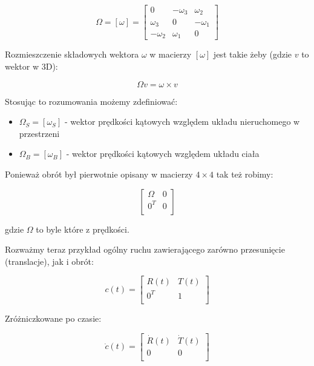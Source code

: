 \documentclass{article}
\begin{document}
$$
    \Omega=\left[\omega\right]=
    \begin{bmatrix}
        0           & -\omega_{3} & \omega_{2}  \\[0.3em]
        \omega_{3}  & 0           & -\omega_{1} \\[0.3em]
        -\omega_{2} & \omega_{1}  & 0
    \end{bmatrix}
$$

Rozmieszczenie składowych wektora $\omega$ w macierzy $\left[\omega\right]$ jest takie żeby (gdzie $v$ to wektor w 3D):

$$
    \Omega v = \omega \times v
$$

\newpage

Stosując to rozumowania możemy zdefiniować:

\begin{itemize}
    \item $\Omega_{S} = \left[\omega_{S}\right]$ - wektor prędkości kątowych względem układu nieruchomego w przestrzeni
    \item $\Omega_{B} = \left[\omega_{B}\right]$ - wektor prędkości kątowych względem układu ciała
\end{itemize}

Ponieważ obrót był pierwotnie opisany w macierzy $4\times4$ tak też robimy:

$$
    \begin{bmatrix}
        \Omega & 0 \\[0.3em]
        0^{T}  & 0 \\[0.3em]
    \end{bmatrix}
$$

gdzie $\Omega$ to byle które z prędkości.



Rozważmy teraz przykład ogólny ruchu zawierającego zarówno przesunięcie (translacje), jak i obrót:

$$
    c(t)=
    \begin{bmatrix}
        R(t)  & T(t) \\[0.3em]
        0^{T} & 1    \\[0.3em]
    \end{bmatrix}
$$

Zróżniczkowane po czasie:


$$
    \dot c(t)=
    \begin{bmatrix}
        \dot R(t) & \dot T(t) \\[0.3em]
        0         & 0         \\[0.3em]
    \end{bmatrix}
$$
\end{document}

